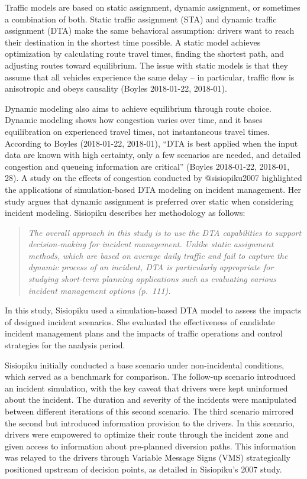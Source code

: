 \documentclass[
  letterpaper,
  DIV=11,
  numbers=noendperiod]{scrreprt}
\begin{document}
Traffic models are based on static assignment, dynamic assignment, or
sometimes a combination of both. Static traffic assignment (STA) and
dynamic traffic assignment (DTA) make the same behavioral assumption:
drivers want to reach their destination in the shortest time possible. A
static model achieves optimization by calculating route travel times,
finding the shortest path, and adjusting routes toward equilibrium. The
issue with static models is that they assume that all vehicles
experience the same delay -- in particular, traffic flow is anisotropic
and obeys causality (Boyles 2018-01-22, 2018-01).

Dynamic modeling also aims to achieve equilibrium through route choice.
Dynamic modeling shows how congestion varies over time, and it bases
equilibration on experienced travel times, not instantaneous travel
times. According to Boyles (2018-01-22, 2018-01), ``DTA is best applied
when the input data are known with high certainty, only a few scenarios
are needed, and detailed congestion and queueing information are
critical'' (Boyles 2018-01-22, 2018-01, 28). A study on the effects of
congestion conducted by @sisiopiku2007 highlighted the applications of
simulation-based DTA modeling on incident management. Her study argues
that dynamic assignment is preferred over static when considering
incident modeling. Sisiopiku describes her methodology as follows:

\begin{quote}
\emph{The overall approach in this study is to use the DTA capabilities
to support decision-making for incident management. Unlike static
assignment methods, which are based on average daily traffic and fail to
capture the dynamic process of an incident, DTA is particularly
appropriate for studying short-term planning applications such as
evaluating various incident management options (p.~111).}
\end{quote}

In this study, Sisiopiku used a simulation-based DTA model to assess the
impacts of designed incident scenarios. She evaluated the effectiveness
of candidate incident management plans and the impacts of traffic
operations and control strategies for the analysis period.

Sisiopiku initially conducted a base scenario under non-incidental
conditions, which served as a benchmark for comparison. The follow-up
scenario introduced an incident simulation, with the key caveat that
drivers were kept uninformed about the incident. The duration and
severity of the incidents were manipulated between different iterations
of this second scenario. The third scenario mirrored the second but
introduced information provision to the drivers. In this scenario,
drivers were empowered to optimize their route through the incident zone
and given access to information about pre-planned diversion paths. This
information was relayed to the drivers through Variable Message Signs
(VMS) strategically positioned upstream of decision points, as detailed
in Sisiopiku's 2007 study.
\end{document}
